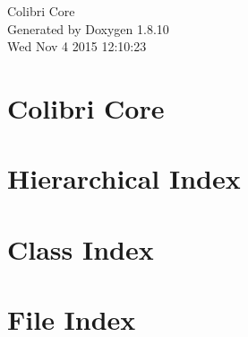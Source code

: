 \documentclass[twoside]{book}
\newcommand{\+}{\discretionary{\mbox{\scriptsize$\hookleftarrow$}}{}{}}
\newcommand{\clearemptydoublepage}{%
  \newpage{\pagestyle{empty}\cleardoublepage}%
}
\begin{document}
\hypersetup{pageanchor=false,
             bookmarks=true,
             bookmarksnumbered=true,
             pdfencoding=unicode
            }
\begin{titlepage}
\vspace*{7cm}
\begin{center}%
{\Large Colibri Core }\\
\vspace*{1cm}
{\large Generated by Doxygen 1.8.10}\\
\vspace*{0.5cm}
{\small Wed Nov 4 2015 12:10:23}\\
\end{center}
\end{titlepage}
\clearemptydoublepage
\tableofcontents
\clearemptydoublepage
{}
\hypersetup{pageanchor=true}

\chapter{Colibri Core}
\label{index}\hypertarget{index}{}
\chapter{Hierarchical Index}

\chapter{Class Index}

\chapter{File Index}

\end{document}
